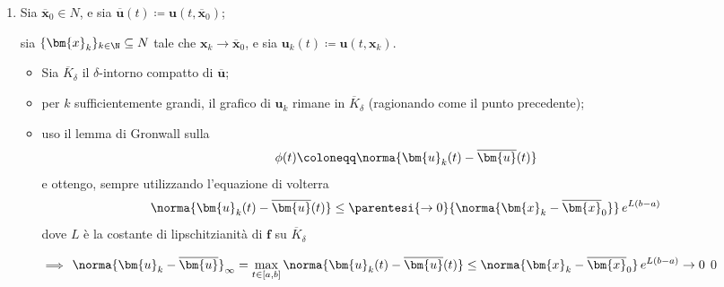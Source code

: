 {\begin{enumerate}
        Sfruttiamo il fatto che $ \bm{u}_0 $ e $ \bm{u}_{ \varepsilon} $ siano le soluzioni di problemi di Cauchy e usiamo le loro equazioni di Volterra. \[
            \bm{u}_{ \varepsilon} (t) =\bm{u}_{ \varepsilon} (a) + \int_{a}^{t} \bm{f}\left(s, \bm{u}_{ \varepsilon}(s)\right) \dif s
        \]Definiamo ora, per ogni $ t \in [a,t_{ \varepsilon} ] $, la funzione \begin{align*}
            \phi(t) &= \norma{\bm{u}_{ \varepsilon}(t)-\bm{u}_{ 0}(t)}\\ &= \norma{%
            \bm{u}_{ \varepsilon}(a) + \int_{a}^{t} \bm{f}\left(s,\bm{u}_{ \varepsilon}(s)\right) \dif s - \bm{u}_0 - \int_{a}^{t} \bm{f}\left(s, \bm{u}_0(s)\right)\dif s 
            }\\ 
            &\le \norma{\bm{u}_{ \varepsilon}(a)-\bm{u}_0(a)} + \int_{a}^{t}\norma{\bm{f}\left(s, \bm{u}_{ \varepsilon}(s)\right) - \bm{f}\left(s, \bm{u}_0(s)\right)}\dif s \\ 
            &\underset{\footnotemark}{\le} \parentesi{A_{ \varepsilon} }{%
                \norma{\bm{x}_{ \varepsilon} -\bm{x}_0} 
            } + L\,\int_{0}^{t}\norma{\bm{u}_{ \varepsilon}(s) - \bm{u}_0(s)}\dif s .
        \end{align*} 

        Dunque, per il lemma di Gronwall, $ \displaystyle \phi(t)\le A_{ \varepsilon}\, e^{L(t-a)}  $. Inoltre, $ \phi(t_{ \varepsilon} ) = \delta $, e si ha che \[
            0< \delta \le A_{ \varepsilon} \, e^{L(t_{ \varepsilon} -a)} \longrightarrow 0 
        \]che è assurdo.
        \item Sia $ \overline{\bm{x}}_0 \in N $, e sia $ \overline{\bm{u}}(t)\coloneqq \bm{u}(t,\overline{\bm{x}}_0) $; 
        
        sia $ \{\bm{x}_{k} \}_{k \in \N} \subseteq N$ tale che $ \bm{x}_k\longrightarrow \overline{\bm{x}}_0 $, e sia $ \bm{u}_k (t)\coloneqq \bm{u}(t,\bm{x}_k)$.\begin{itemize}
            \item Sia $ \overline{K}_{\delta} $ il $ \delta $-intorno compatto di $ \overline{\bm{u}} $;
            \item per $ k $ sufficientemente grandi, il grafico di $ \bm{u}_k $ rimane in $ \overline{K}_{\delta} $ (ragionando come il punto precedente);
            \item uso il lemma di Gronwall sulla \[
                \phi(t)\coloneqq\norma{\bm{u}_k(t)-\overline{\bm{u}}(t)}
            \]e ottengo, sempre utilizzando l'equazione di volterra \[
                \norma{\bm{u}_k(t)-\overline{\bm{u}}(t)} \le \parentesi{\to 0}{\norma{\bm{x}_k-\overline{\bm{x}}_0}}\,e^{L(b-a)}
            \]dove $ L $ è la costante di lipschitzianità di $ \bm{f} $ su $ \overline{K}_{\delta} $ 
            
            $\implies$ $\displaystyle \norma{\bm{u}_k-\overline{\bm{u}}}_{\infty} = \max_{t \in [a,b]} \norma{\bm{u}_k(t)-\overline{\bm{u}}(t)}\le \norma{\bm{x}_k-\overline{\bm{x}}_0}\,e^{L(b-a)}\to 0  $\qed
        \end{itemize}
    \end{enumerate}
}
